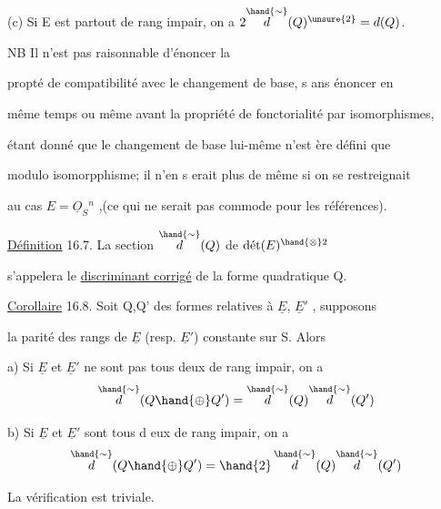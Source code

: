 
(c) Si E est partout de rang impair, on a $2\overset{\hand{\sim}}{d}(Q)^{\unsure{2}} = d(Q)$.


 \quad NB Il n'est pas raisonnable d'énoncer la

propté de compatibilité avec le changement de base, s ans énoncer en

même temps\hand{,} ou même avant\hand{,} la propriété de fonctorialité par isomorphismes,

étant donné que le changement de base  lui-même n'est ère défini que

modulo isomorpphisme; il n'en s erait plus de même si on se restreignait

au cas $E = \underline{O}_S{}^n$ ,(ce qui ne serait pas commode pour les références).

 \quad \uline{Définition} 16.7. La section $\overset{\hand{\sim}}{d}(Q)$ de $\text{dét}(E)^{\hand{\otimes}2}$

s'appelera le \uline{discriminant corrigé} de la forme quadratique Q.

\uline{Corollaire} 16.8. Soit Q,Q' des formes relatives à $\underline{E}$, $\underline{E}'$ , supposons

la parité des rangs de $\underline{E}$ (resp. $\underline{E}'$) constante sur S. Alors

a) Si $\underline{E}$ et $\underline{E}'$ ne sont pas tous deux de rang impair, on a
\[ \overset{\hand{\sim}}{d}(Q \hand{\oplus} Q') = \overset{\hand{\sim}}{d}(Q)\overset{\hand{\sim}}{d}(Q') \]

b) Si $\underline{E}$ et $\underline{E}'$ sont tous d eux de rang impair, on a
\[ \overset{\hand{\sim}}{d}(Q \hand{\oplus} Q') = \hand{2}\,\overset{\hand{\sim}}{d}(Q)\overset{\hand{\sim}}{d}(Q') \]

La vérification est triviale.

